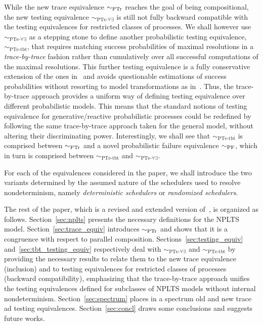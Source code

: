 \documentclass{LMCS}
\newcommand{\sbis}[1]
	{\sim_{#1}}
\begin{document}
While the new trace equivalence $\sbis{\rm PTr}$ reaches the goal of being compositional, the new testing
equivalence $\sbis{\textrm{PTe-}\forall\exists}$ is still not fully backward compatible with the testing
equivalences for restricted classes of processes. We shall however use $\sbis{\textrm{PTe-}\forall\exists}$
as a stepping stone to define another probabilistic testing equivalence, $\sbis{\textrm{PTe-tbt}}$, that
requires matching success probabilities of maximal resolutions in a \emph{trace-by-trace} fashion rather
than cumulatively over all successful computations of the maximal resolutions. This further testing
equivalence is a fully conservative extension of the ones in~\cite{DH84,CDSY99,KN98} and avoids questionable
estimations of success probabilities without resorting to model transformations as in~\cite{GA12}. Thus, the
trace-by-trace approach provides a uniform way of defining testing equivalence over different probabilistic
models. This means that the standard notions of testing equivalence for generative/reactive probabilistic
processes could be redefined by following the same trace-by-trace approach taken for the general model,
without altering their discriminating power. Interestingly, we shall see that $\sbis{\textrm{PTe-tbt}}$ is
comprised between $\sbis{\rm PTr}$ and a novel probabilistic failure equivalence $\sbis{\rm PF}$, which in
turn is comprised between $\sbis{\textrm{PTe-tbt}}$ and $\sbis{\textrm{PTe-}\forall\exists}$.

For each of the equivalences considered in the paper, we shall introduce the two variants determined by the
assumed nature of the schedulers used to resolve nondeterminism, namely \emph{deterministic schedulers} or
\emph{randomized schedulers}.

The rest of the paper, which is a revised and extended version of~\cite{BDL12}, is organized as follows.
Section~\ref{sec:nplts} presents the necessary definitions for the NPLTS model.
Section~\ref{sec:trace_equiv} introduces $\sbis{\rm PTr}$ and shows that it is a congruence with respect to
parallel composition. Sections~\ref{sec:testing_equiv} and~\ref{sec:tbt_testing_equiv} respectively deal
with $\sbis{\textrm{PTe-}\forall\exists}$ and $\sbis{\textrm{PTe-tbt}}$ by providing the necessary results
to relate them to the new trace equivalence (inclusion) and to testing equivalences for restricted classes
of processes (backward compatibility), emphasizing that the trace-by-trace approach unifies the testing
equivalences defined for subclasses of NPLTS models without internal nondeterminism.
Section~\ref{sec:spectrum} places in a spectrum old and new trace ad testing equivalences.
Section~\ref{sec:concl} draws some conclusions and suggests future works.
\end{document}
